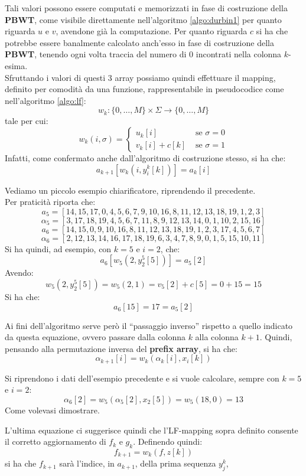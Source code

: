 Tali valori possono essere computati e memorizzati in fase di costruzione della
\textbf{PBWT}, come visibile direttamente nell'algoritmo \ref{algo:durbin1} per
quanto riguarda $u$ e $v$, avendone già la computazione. Per quanto riguarda $c$
si ha che potrebbe essere banalmente calcolato anch'esso in fase di costruzione
della \textbf{PBWT}, tenendo ogni volta traccia del numero di 0 incontrati
nella colonna $k$-esima.\\
Sfruttando i valori di questi 3 array possiamo quindi effettuare il mapping,
definito per comodità da una funzione, rappresentabile in pseudocodice come
nell'algoritmo \ref{algo:lf}:
\[w_k:\{0,\ldots,M\}\times\Sigma\to \{0,\ldots,M\}\]
tale per cui:
\[w_k(i,\sigma)=
  \begin{cases}
    u_k[i]&\mbox{ se }\sigma=0\\
    v_k[i]+c[k]&\mbox{ se }\sigma=1
  \end{cases}
\]
Infatti, come confermato anche dall'algoritmo di costruzione stesso, si ha che:
\[a_{k+1}\left[w_k\left(i,y_i^k[k]\right)\right]=a_k[i]\]
\begin{esempio}
  Vediamo un piccolo esempio chiarificatore, riprendendo il precedente.\\
  Per praticità riporta che:
  \[a_5=[14,15,17,0,4,5,6,7,9,10,16,8,11,12,13,18,19,1,2,3]\]
  \[\alpha_5=[3,17,18,19,4,5,6,7,11,8,9,12,13,14,0,1,10,2,15,16]\]
  \[a_6=[14,15,0,9,10,16,8,11,12,13,18,19,1,2,3,17,4,5,6,7]\]
  \[\alpha_6=[2,12,13,14,16,17,18,19,6,3,4,7,8,9,0,1,5,15,10,11]\]
  Si ha quindi, ad esempio, con $k=5$ e $i=2$, che:
  \[a_{6}\left[w_5\left(2,y_2^5[5]\right)\right]=a_5[2]\]
  Avendo:
  \[w_5\left(2,y_2^5[5]\right)=w_5\left(2,1\right)=v_5[2]+c[5]=0+15=15\]
  Si ha che:
  \[a_{6}[15]=17=a_5[2]\]
\end{esempio}
Ai fini dell'algoritmo serve però il ``passaggio inverso'' rispetto a quello
indicato da questa equazione, ovvero passare dalla colonna $k$ alla colonna
$k+1$. Quindi, pensando alla permutazione inversa del \textbf{prefix array}, si
ha che:
\[\alpha_{k+1}[i]=w_k(\alpha_k[i],x_i[k])\]
\begin{esempio}
  Si riprendono i dati dell'esempio precedente e si vuole calcolare, sempre con
  $k=5$ e $i=2$:
  \[\alpha_{6}[2]=w_5(\alpha_5[2],x_2[5])=w_5(18,0)=13\]
  Come volevasi dimostrare.
\end{esempio}
L'ultima equazione ci suggerisce quindi che l'LF-mapping sopra definito
consente il corretto aggiornamento di $f_k$ e $g_k$.
Definendo quindi:
\[f_{k+1}=w_k(f,z[k])\]
si ha che $f_{k+1}$ sarà l'indice, in $a_{k+1}$, della prima sequenza $y_j^k$,
